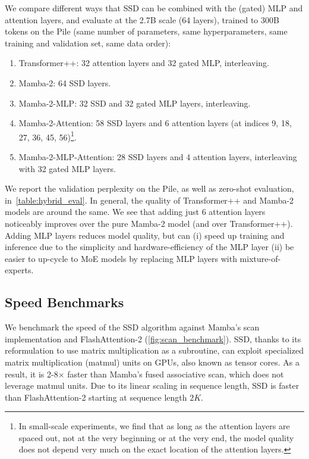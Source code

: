 We compare different ways that SSD can be combined with the (gated) MLP and attention layers, and evaluate at the 2.7B scale (64 layers), trained to 300B tokens on the Pile (same number of parameters, same hyperparameters, same training and validation set, same data order):

\begin{enumerate}
\item Transformer++: 32 attention layers and 32 gated MLP, interleaving.
\item Mamba-2: 64 SSD layers.
\item Mamba-2-MLP: 32 SSD and 32 gated MLP layers, interleaving.
\item Mamba-2-Attention: 58 SSD layers and 6 attention layers (at indices 9, 18, 27, 36, 45, 56)\footnote{In small-scale experiments, we find that as long as the attention layers are spaced out, not at the very beginning or at the very end, the model quality does not depend very much on the exact location of the attention layers.}.
\item Mamba-2-MLP-Attention: 28 SSD layers and 4 attention layers, interleaving with 32 gated MLP layers.
\end{enumerate}

We report the validation perplexity on the Pile, as well as zero-shot evaluation, in~\ref{table:hybrid_eval}.
In general, the quality of Transformer++ and Mamba-2 models are around the same. We see that adding just 6 attention layers noticeably improves over the pure Mamba-2 model (and over Transformer++). Adding MLP layers reduces model quality, but can (i) speed up training and inference due to the simplicity and hardware-efficiency of the MLP layer (ii) be easier to up-cycle to MoE models by replacing MLP layers with mixture-of-experts.

\subsection{Speed Benchmarks}
\label{sec:experiments:benchmark}

We benchmark the speed of the SSD algorithm against Mamba's scan implementation and FlashAttention-2 (\ref{fig:scan_benchmark}).
SSD, thanks to its reformulation to use matrix multiplication as a subroutine, can exploit specialized matrix multiplication (matmul) units on GPUs, also known as tensor cores. As a result, it is 2-8$\times$ faster than Mamba's fused associative scan, which does not leverage matmul units. Due to its linear scaling in sequence length, SSD is faster than FlashAttention-2 starting at sequence length $2K$.

